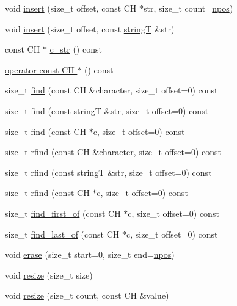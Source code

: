 \begin{DoxyCompactItemize}
\item 
void \hyperlink{classfm_1_1stringT_aa898920856dfbfdd06b789a13011b2a7}{insert} (size\_\-t offset, const CH $\ast$str, size\_\-t count=\hyperlink{classfm_1_1stringT_a1713528ab4d3f25c806389871be1a04f}{npos})
\item 
void \hyperlink{classfm_1_1stringT_aa9c4b71f6b969171f00d2c14af21d858}{insert} (size\_\-t offset, const \hyperlink{classfm_1_1stringT}{stringT} \&str)
\item 
const CH $\ast$ \hyperlink{classfm_1_1stringT_a9497254adcc9a3544938c0f39f2a02a9}{c\_\-str} () const 
\item 
\hyperlink{classfm_1_1stringT_a02edc24c2f0d76e24425c23a352aadfd}{operator const CH $\ast$} () const 
\item 
size\_\-t \hyperlink{classfm_1_1stringT_a75738cd223adeb0048e5c306c06957ec}{find} (const CH \&character, size\_\-t offset=0) const 
\item 
size\_\-t \hyperlink{classfm_1_1stringT_afe9748c9d0d5228003a2631ee4e7e712}{find} (const \hyperlink{classfm_1_1stringT}{stringT} \&str, size\_\-t offset=0) const 
\item 
size\_\-t \hyperlink{classfm_1_1stringT_aef7318ed47901edb4a10d7816c6f3e23}{find} (const CH $\ast$c, size\_\-t offset=0) const 
\item 
size\_\-t \hyperlink{classfm_1_1stringT_af68aa9bf2b26cf309de695e09dab5d1f}{rfind} (const CH \&character, size\_\-t offset=0) const 
\item 
size\_\-t \hyperlink{classfm_1_1stringT_a1e23a4e895dc4afe0e4625785abab6df}{rfind} (const \hyperlink{classfm_1_1stringT}{stringT} \&str, size\_\-t offset=0) const 
\item 
size\_\-t \hyperlink{classfm_1_1stringT_aaed8ec53276e4b799376f103a1a392b6}{rfind} (const CH $\ast$c, size\_\-t offset=0) const 
\item 
size\_\-t \hyperlink{classfm_1_1stringT_a3a302001388d04200a05dc3110f92a04}{find\_\-first\_\-of} (const CH $\ast$c, size\_\-t offset=0) const 
\item 
size\_\-t \hyperlink{classfm_1_1stringT_a10439fc3486ad50babd3c45f8ef0596f}{find\_\-last\_\-of} (const CH $\ast$c, size\_\-t offset=0) const 
\item 
void \hyperlink{classfm_1_1stringT_aeec1813975fa200ea33ba073a94b0811}{erase} (size\_\-t start=0, size\_\-t end=\hyperlink{classfm_1_1stringT_a1713528ab4d3f25c806389871be1a04f}{npos})
\item 
void \hyperlink{classfm_1_1stringT_af5da90ede23bf7771ba3b8d6f7c9b845}{resize} (size\_\-t size)
\item 
void \hyperlink{classfm_1_1stringT_a8bcb423fa97a2dad9117a8dd96657525}{resize} (size\_\-t count, const CH \&value)
\end{DoxyCompactItemize}
